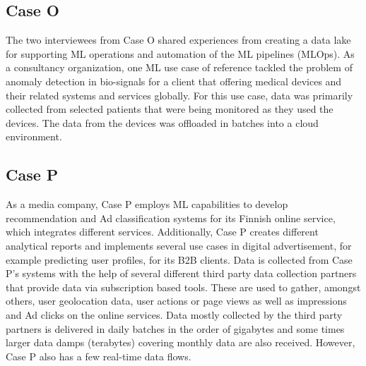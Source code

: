 \subsection{Case O}
The two interviewees from Case O shared experiences from creating a data lake for supporting ML operations and automation of the ML pipelines (MLOps). As a consultancy organization, one ML use case of reference tackled the problem of anomaly detection in bio-signals for a client that offering medical devices and their related systems and services globally. For this use case, data was primarily collected from selected patients that were being monitored as they used the devices. The data from the devices was offloaded in batches into a cloud environment.  


\subsection{Case P}
As a media company, Case P employs ML capabilities to develop recommendation and Ad classification systems for its Finnish online service, which integrates different services. Additionally, Case P creates different analytical reports and implements several use cases in digital advertisement, for example predicting user profiles, for its B2B clients. Data is collected from Case P's systems with the help of several different third party data collection partners that provide data via subscription based tools. These are used to gather, amongst others, user geolocation data, user actions or page views as well as impressions and Ad clicks on the online services. Data mostly collected by the third party partners is delivered in daily batches in the order of gigabytes and some times larger data damps (terabytes) covering monthly data are also received. However, Case P also has a few real-time data flows. 




